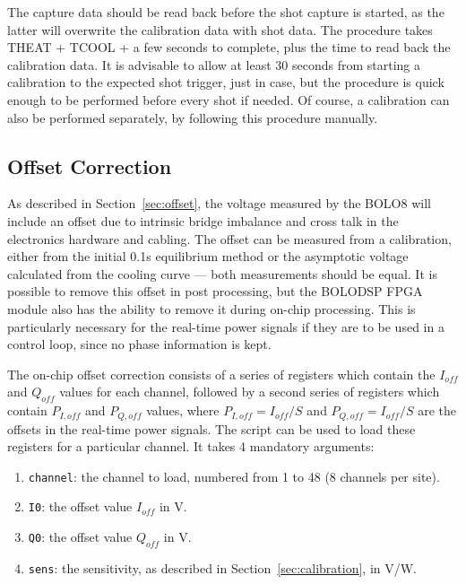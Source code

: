 \documentclass[12pt,a4paper]{article}
\begin{document}
The capture data should be read back before the shot capture is started, as the latter will overwrite the calibration data with shot data. The procedure
takes THEAT + TCOOL + a few seconds to complete, plus the time to read back the calibration data. It is advisable to allow at least 30 seconds from
starting a calibration to the expected shot trigger, just in case, but the procedure is quick enough to be performed before every shot if needed. Of
course, a calibration can also be performed separately, by following this procedure manually.

\subsection{Offset Correction}
\label{sec:offset_correction}
As described in Section~\ref{sec:offset}, the voltage measured by the BOLO8 will include an offset due to intrinsic bridge imbalance and cross talk in the
electronics hardware and cabling. The offset can be measured from a calibration, either from the initial 0.1s equilibrium method or the asymptotic voltage
calculated from the cooling curve --- both measurements should be equal. It is possible to remove this offset in post processing, but the BOLODSP FPGA
module also has the ability to remove it during on-chip processing. This is particularly necessary for the real-time power signals if they are to be used
in a control loop, since no phase information is kept.

The on-chip offset correction consists of a series of registers which contain the $I_{off}$ and $Q_{off}$ values for each channel, followed by a second
series of registers which contain $P_{I,off}$ and $P_{Q,off}$ values, where $P_{I,off} = I_{off}/S$ and $P_{Q,off} = I_{off}/S$ are the offsets in the
real-time power signals. The script \mbox{} can be used to load these registers for a particular channel. It
takes 4 mandatory arguments:
\begin{enumerate}
\item{\texttt{channel}: the channel to load, numbered from 1 to 48 (8 channels per site).}
\item{\texttt{I0}: the offset value $I_{off}$ in V.}
\item{\texttt{Q0}: the offset value $Q_{off}$ in V.}
\item{\texttt{sens}: the sensitivity, as described in Section~\ref{sec:calibration}, in V/W.}
\end{enumerate}
\end{document}
